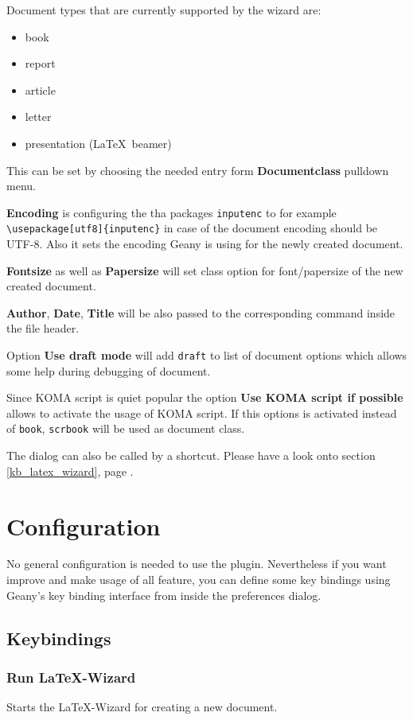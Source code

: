 \documentclass[/%
a4paper,%
10pt,%
oneside,%
DIV18,
headsepline,         %
plainheadsepline,
footsepline,         %
plainfootsepline,
bibtotoc,%
liststotoc,%
BCOR12mm,%
halfparskip,%
openany,%
]{scrartcl}
\begin{document}
Document types that are currently supported by the wizard are:
\begin{itemize}
	\item book
	\item report
	\item article
	\item letter
	\item presentation (\LaTeX\ beamer)
\end{itemize}

This can be set by choosing the needed entry form
\textbf{Documentclass} pulldown menu.

\textbf{Encoding} is configuring the tha packages \texttt{inputenc} to
for example \texttt{\textbackslash usepackage[utf8]\{inputenc\}} in
case of the document encoding should be UTF-8. Also it sets the
encoding Geany is using for the newly created document.

\textbf{Fontsize} as well as \textbf{Papersize} will set class option
for font/papersize of the new created document.

\textbf{Author}, \textbf{Date}, \textbf{Title} will be also passed to
the corresponding command inside the file header.

Option \textbf{Use draft mode} will add \texttt{draft} to list of
document options which allows some help during debugging of document.

Since KOMA script is quiet popular the option \textbf{Use KOMA script
if possible} allows to activate the usage of KOMA script. If this
options is activated instead of \texttt{book}, \texttt{scrbook} will
be used as document class.

The dialog can also be called by a shortcut. Please have a look onto
section \ref{kb_latex_wizard}, page \pageref{kb_latex_wizard}.


\section{Configuration}

No general configuration is needed to use the plugin. Nevertheless if
you want improve and make usage of all feature, you can define some
key bindings using Geany's key binding interface from inside the
preferences dialog.

\subsection{Keybindings}

\subsubsection*{Run LaTeX-Wizard}
\label{kb_latex_wizard}
Starts the LaTeX-Wizard for creating a new document.
\end{document}
